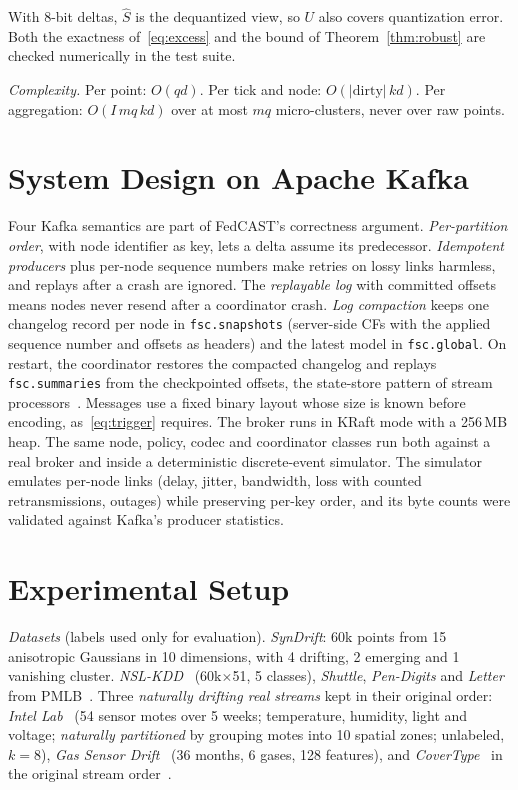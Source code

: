 \documentclass[journal]{IEEEtran}
\begin{document}
With 8-bit deltas, $\hat S$ is the dequantized view, so $U$ also covers quantization error. Both the exactness of~\eqref{eq:excess} and the bound of Theorem~\ref{thm:robust} are checked numerically in the test suite.

\textit{Complexity.} Per point: $O(qd)$. Per tick and node: $O(|\mathrm{dirty}|\,kd)$. Per aggregation: $O(I\,mq\,kd)$ over at most $mq$ micro-clusters, never over raw points.

\section{System Design on Apache Kafka}\label{sec:system}
Four Kafka semantics are part of FedCAST's correctness argument. \emph{Per-partition order}, with node identifier as key, lets a delta assume its predecessor. \emph{Idempotent producers} plus per-node sequence numbers make retries on lossy links harmless, and replays after a crash are ignored. The \emph{replayable log} with committed offsets means nodes never resend after a coordinator crash. \emph{Log compaction} keeps one changelog record per node in \texttt{fsc.snapshots} (server-side CFs with the applied sequence number and offsets as headers) and the latest model in \texttt{fsc.global}. On restart, the coordinator restores the compacted changelog and replays \texttt{fsc.summaries} from the checkpointed offsets, the state-store pattern of stream processors~\cite{carbone2017flinkstate}. Messages use a fixed binary layout whose size is known before encoding, as~\eqref{eq:trigger} requires. The broker runs in KRaft mode with a 256\,MB heap. The same node, policy, codec and coordinator classes run both against a real broker and inside a deterministic discrete-event simulator. The simulator emulates per-node links (delay, jitter, bandwidth, loss with counted retransmissions, outages) while preserving per-key order, and its byte counts were validated against Kafka's producer statistics.

\section{Experimental Setup}\label{sec:setup}
\textit{Datasets} (labels used only for evaluation). \emph{SynDrift}: 60k points from 15 anisotropic Gaussians in 10 dimensions, with 4 drifting, 2 emerging and 1 vanishing cluster. \emph{NSL-KDD}~\cite{tavallaee2009nslkdd} (60k$\times$51, 5 classes), \emph{Shuttle}, \emph{Pen-Digits} and \emph{Letter} from PMLB~\cite{olson2017pmlb}. Three \emph{naturally drifting real streams} kept in their original order: \emph{Intel Lab}~\cite{intellab2004} (54 sensor motes over 5 weeks; temperature, humidity, light and voltage; \emph{naturally partitioned} by grouping motes into 10 spatial zones; unlabeled, $k=8$), \emph{Gas Sensor Drift}~\cite{vergara2012gas} (36 months, 6 gases, 128 features), and \emph{CoverType}~\cite{blackard1999covtype} in the original stream order~\cite{losing2016sam}.
\end{document}
